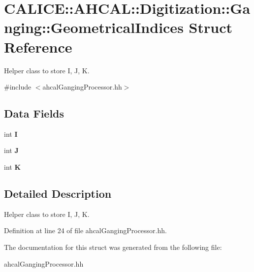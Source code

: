 \section{C\-A\-L\-I\-C\-E\-:\-:A\-H\-C\-A\-L\-:\-:Digitization\-:\-:Ganging\-:\-:Geometrical\-Indices Struct Reference}
\label{structCALICE_1_1AHCAL_1_1Digitization_1_1Ganging_1_1GeometricalIndices}


Helper class to store I, J, K.  




{\ttfamily \#include $<$ahcal\-Ganging\-Processor.\-hh$>$}

\subsection*{Data Fields}
\begin{DoxyCompactItemize}
\item 
int {\bfseries I}\label{structCALICE_1_1AHCAL_1_1Digitization_1_1Ganging_1_1GeometricalIndices_a00ea48769a635791267befbaafc7c108}

\item 
int {\bfseries J}\label{structCALICE_1_1AHCAL_1_1Digitization_1_1Ganging_1_1GeometricalIndices_a1aea854b7760847766a913eb21ee92b6}

\item 
int {\bfseries K}\label{structCALICE_1_1AHCAL_1_1Digitization_1_1Ganging_1_1GeometricalIndices_adc1fe191a35572a32d77db4b69d1e4e5}

\end{DoxyCompactItemize}


\subsection{Detailed Description}
Helper class to store I, J, K. 

Definition at line 24 of file ahcal\-Ganging\-Processor.\-hh.



The documentation for this struct was generated from the following file\-:\begin{DoxyCompactItemize}
\item 
ahcal\-Ganging\-Processor.\-hh\end{DoxyCompactItemize}
